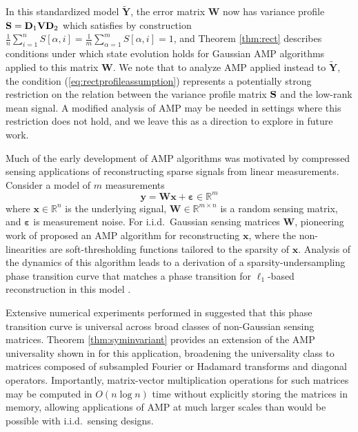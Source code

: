 \documentclass[10pt,reqno]{amsart}
\def\a{\alpha}
\def\x{\mathbf{x}}
\def\y{\mathbf{y}}
\def\W{\mathbf{W}}
\def\S{\mathbf{S}}
\def\D{\mathbf{D}}
\def\Y{\mathbf{Y}}
\def\R{\mathbb{R}}
\begin{document}
\begin{example}
In this standardized model $\widetilde{\Y}$, the error matrix $\W$ now has
variance profile $\S=\D_1 \Vb\D_2$ which satisfies by construction
$\frac{1}{n}\sum_{i=1}^n S[\a,i]=\frac{1}{m}\sum_{\a=1}^m S[\a,i]=1$,
and Theorem \ref{thm:rect} describes conditions under which
state evolution holds for Gaussian AMP algorithms applied to this
matrix $\W$. We note that to analyze AMP applied instead
to $\widetilde{\Y}$, the condition
(\ref{eq:rectprofileassumption}) represents a potentially strong restriction
on the relation between the variance profile matrix $\mathbf{S}$ and the low-rank
mean signal. A modified analysis of AMP may be needed in settings where this
restriction does not hold, and we leave this as a direction to explore in
future work.
\end{example}

\begin{example}\label{ex:CS}
Much of the early development of AMP algorithms was motivated by compressed sensing
applications of reconstructing sparse signals from linear
measurements. Consider a model of $m$ measurements
\[\y=\W \x+\bm{\varepsilon} \in \R^m\]
where $\x \in \R^n$ is the underlying signal, $\W \in \R^{m \times n}$ is a
random sensing matrix, and $\bm{\varepsilon}$ is measurement noise. 
For i.i.d.\ Gaussian sensing matrices $\W$, pioneering work of
\cite{donoho2009message,donoho2010messagea,donoho2010messageb}
proposed an AMP algorithm for reconstructing $\x$, where the non-linearities are
soft-thresholding functions tailored to the sparsity of $\x$.
Analysis of the dynamics of this algorithm leads to a derivation of a
sparsity-undersampling phase transition curve that matches a phase transition
for $\ell_1$-based reconstruction
in this model
\cite{donoho2005neighborliness,donoho2009message,bayati2011dynamics,bayati2015universality}.

Extensive numerical experiments performed in
\cite{donoho2009observed,monajemi2013deterministic} suggested that this
phase transition curve is universal across broad classes of non-Gaussian
sensing matrices. Theorem \ref{thm:syminvariant} provides an extension of the
AMP universality shown in \cite{bayati2015universality} for this application,
broadening the universality
class to matrices composed of subsampled Fourier or
Hadamard transforms and diagonal operators. Importantly, matrix-vector
multiplication operations for such matrices may be computed in $O(n \log n)$
time without explicitly storing the matrices in memory, allowing
applications of AMP at much larger scales than would be possible with
i.i.d.\ sensing designs.


\end{example}
\end{document}

